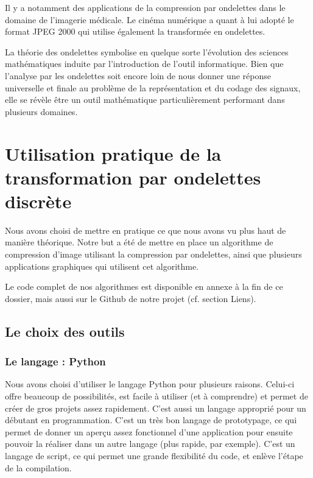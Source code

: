 \documentclass{article}
\begin{document}
Il y a notamment des applications de la compression par ondelettes dans le domaine de l’imagerie médicale. Le cinéma numérique a quant à lui adopté le format JPEG 2000 qui utilise également la transformée en ondelettes. 

La théorie des ondelettes symbolise en quelque sorte l’évolution des sciences mathématiques induite par l’introduction de l’outil informatique. 
Bien que l’analyse par les ondelettes soit encore loin de nous donner une réponse universelle et finale au problème de la représentation et du codage des signaux, elle se révèle être un outil mathématique particulièrement performant dans plusieurs domaines. 


\section{Utilisation pratique de la transformation par ondelettes discrète}

Nous avons choisi de mettre en pratique ce que nous avons vu plus haut de manière théorique. Notre but a été de mettre en place un algorithme de compression d'image utilisant la compression par ondelettes, ainsi que plusieurs applications graphiques qui utilisent cet algorithme.

Le code complet de nos algorithmes est disponible en annexe à la fin de ce dossier, mais aussi sur le Github de notre projet (cf. section Liens).



\subsection{Le choix des outils}


\subsubsection{Le langage : Python}

Nous avons choisi d'utiliser le langage Python pour plusieurs raisons. Celui-ci offre beaucoup de possibilités, est facile à utiliser (et à comprendre) et permet de créer de gros projets assez rapidement. C'est aussi un langage approprié pour un débutant en programmation. C'est un très bon langage de prototypage, ce qui permet de donner un aperçu assez fonctionnel d'une application pour ensuite pouvoir la réaliser dans un autre langage (plus rapide, par exemple). C'est un langage de script, ce qui permet une grande flexibilité du code, et enlève l'étape de la compilation.
\end{document}
